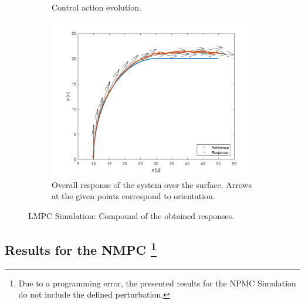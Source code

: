 \documentclass[conference]{IEEEtran}
\begin{document}
\begin{figure}
\begin{subfigure}[t]{0.4\textwidth}
\caption{\label{fig:lmpcu}Control action evolution.}
\end{subfigure}
\begin{subfigure}[t]{0.4\textwidth}
\includegraphics[width=1.2\textwidth]{lmpc_xy.png}
\caption{\label{fig:lmpcxy}Overall response of the system over the surface. Arrows at the given points correspond to orientation.}
\end{subfigure}
\caption{\label{fig:lmpc_simulation}LMPC Simulation: Compound of the obtained responses.}
\end{figure}



\subsection{Results for the NMPC
\protect\footnote{\color{red}Due to a programming error, the presented results for the NPMC Simulation do not include the defined perturbation.\color{black}}}
\label{CC}
\end{document}
